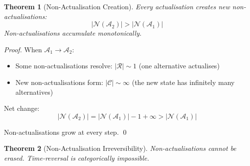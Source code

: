 \documentclass[twocolumn,10pt]{article}
\newtheorem{theorem}{Theorem}[section]
\theoremstyle{definition}
\theoremstyle{remark}
\begin{document}
\begin{theorem}[Non-Actualisation Creation]
\label{thm:creation}
Every actualisation creates new non-actualisations:
\begin{equation}
|\mathcal{N}(\mathcal{A}_2)| > |\mathcal{N}(\mathcal{A}_1)|
\end{equation}
Non-actualisations accumulate monotonically.
\end{theorem}

\begin{proof}
When $\mathcal{A}_1 \to \mathcal{A}_2$:
\begin{itemize}
\item Some non-actualisations resolve: $|\mathcal{R}| \sim 1$ (one alternative actualises)
\item New non-actualisations form: $|\mathcal{C}| \sim \infty$ (the new state has infinitely many alternatives)
\end{itemize}

Net change:
\begin{equation}
|\mathcal{N}(\mathcal{A}_2)| = |\mathcal{N}(\mathcal{A}_1)| - 1 + \infty > |\mathcal{N}(\mathcal{A}_1)|
\end{equation}

Non-actualisations grow at every step. \qed
\end{proof}

\begin{theorem}[Non-Actualisation Irreversibility]
\label{thm:irreversibility}
Non-actualisations cannot be erased. Time-reversal is categorically impossible.
\end{theorem}
\end{document}
